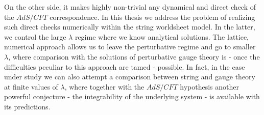 On the other side, it makes highly non-trivial any dynamical and direct check of the $AdS/CFT$ correspondence. In this thesis we address the problem of realizing such direct checks numerically within the string worldsheet model. In the latter, we control the large $\lambda$ regime where we know analytical solutions. The lattice, numerical approach allows us to leave the perturbative regime and go to smaller $\lambda$, where
comparison with the solutions of  perturbative gauge theory is - once the difficulties peculiar to this approach are tamed - possible.
In fact, in the case under study we can also attempt a comparison between string and gauge theory at finite values of $\lambda$, where together with the $AdS/CFT$ hypothesis another powerful conjecture - the integrability of the underlying system -  is available with its predictions.
%
%
%
%
%
%
%
%
